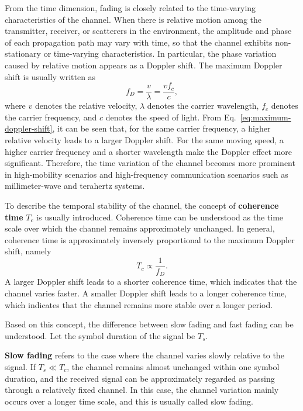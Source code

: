 From the time dimension,
fading is closely related to the time-varying characteristics of the channel.
When there is relative motion among the transmitter,
receiver,
or scatterers in the environment,
the amplitude and phase of each propagation path may vary with time,
so that the channel exhibits non-stationary or time-varying characteristics.
In particular,
the phase variation caused by relative motion appears as a Doppler shift.
The maximum Doppler shift is usually written as
\begin{equation}
    f_D
    =
    \frac{v}{\lambda}
    =
    \frac{v f_c}{c},
    \label{eq:maximum-doppler-shift}
\end{equation}
where
\(v\) denotes the relative velocity,
\(\lambda\) denotes the carrier wavelength,
\(f_c\) denotes the carrier frequency,
and \(c\) denotes the speed of light.
From Eq.~\eqref{eq:maximum-doppler-shift},
it can be seen that,
for the same carrier frequency,
a higher relative velocity leads to a larger Doppler shift.
For the same moving speed,
a higher carrier frequency and a shorter wavelength make the Doppler effect more significant.
Therefore,
the time variation of the channel becomes more prominent in high-mobility scenarios
and high-frequency communication scenarios such as millimeter-wave and terahertz systems.

To describe the temporal stability of the channel,
the concept of \textbf{coherence time} \(T_c\) is usually introduced.
Coherence time can be understood as the time scale over which the channel remains approximately unchanged.
In general,
coherence time is approximately inversely proportional to the maximum Doppler shift,
namely
\begin{equation}
    T_c
    \propto
    \frac{1}{f_D}.
    \label{eq:coherence-time}
\end{equation}
A larger Doppler shift leads to a shorter coherence time,
which indicates that the channel varies faster.
A smaller Doppler shift leads to a longer coherence time,
which indicates that the channel remains more stable over a longer period.

Based on this concept,
the difference between slow fading and fast fading can be understood.
Let the symbol duration of the signal be \(T_s\).

\textbf{Slow fading} refers to the case where the channel varies slowly relative to the signal.
If \(T_s \ll T_c\),
the channel remains almost unchanged within one symbol duration,
and the received signal can be approximately regarded as passing through a relatively fixed channel.
In this case,
the channel variation mainly occurs over a longer time scale,
and this is usually called slow fading.

